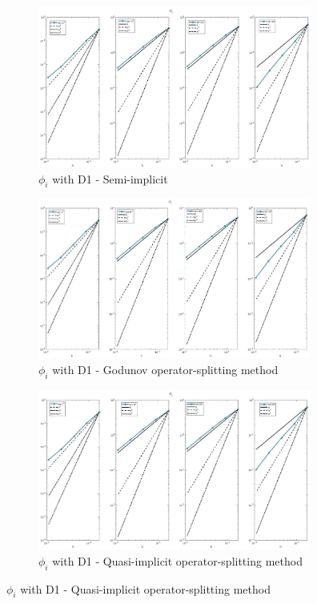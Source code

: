 \documentclass[a4paper,11pt]{article}
\begin{document}
\begin{figure}[h]
\begin{center}
\end{center}
\begin{subfigure}{0.5\textwidth}
\includegraphics[width = 9cm]{./D1_Phii_1.jpg}
\caption*{$\phi_i$ with D1 - Semi-implicit}
\end{subfigure}
\begin{subfigure}{0.5\textwidth}
\includegraphics[width =9cm]{./D1_Phii_1_GO.jpg}
\caption*{$\phi_i$ with D1 - Godunov operator-splitting method}
\end{subfigure}
\begin{center}
\begin{subfigure}{0.5\textwidth}
\includegraphics[width =9cm]{./D1_Phii_1_OS.jpg}
\caption*{$\phi_i$ with D1 - Quasi-implicit operator-splitting method}
\end{subfigure}
\end{center}
\end{figure}

\newpage
\end{document}
